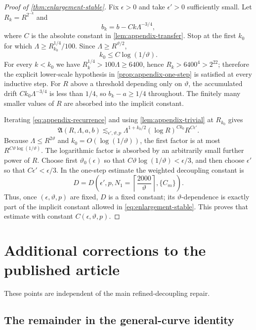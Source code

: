 \documentclass[11pt,letterpaper]{amsart}
\begin{document}
\begin{proof}[Proof of \cref{thm:enlargement-stable}]
Fix $\epsilon>0$ and take $\epsilon'>0$ sufficiently small.  Let
$R_k=R^{2^{-k}}$ and
\[
 b_k=b-Ck\Lambda^{-3/4},
\]
where $C$ is the absolute constant in \cref{lem:appendix-transfer}.  Stop at
the first $k_0$ for which $\Lambda\ge R_{k_0}^{1/4}/100$.  Since
$\Lambda\ge R^{\vartheta/2}$,
\[
 k_0\le C\log(1/\vartheta).
\]
For every $k<k_0$ we have
$R_k^{1/4}>100\Lambda\ge6400$, hence
$R_k>6400^4>2^{22}$; therefore the explicit lower-scale hypothesis in
\cref{prop:appendix-one-step} is satisfied at every inductive step.
For $R$ above a threshold depending only on $\vartheta$, the accumulated
drift $Ck_0\Lambda^{-3/4}$ is less than $1/4$, so $b_k-a\ge1/4$ throughout.
The finitely many smaller values of $R$ are absorbed into the implicit
constant.

Iterating \eqref{eq:appendix-recurrence} and using
\cref{lem:appendix-trivial} at $R_{k_0}$ gives
\[
 \mathfrak A(R,\Lambda,a,b)
 \lesssim_{\epsilon',\vartheta,p}
 \Lambda^{1+k_0/2}
 (\log R)^{Ck_0}
 R^{C\epsilon'}.
\]
Because $\Lambda\le R^{2\vartheta}$ and
$k_0=O(\log(1/\vartheta))$, the first factor is at most
$R^{C\vartheta\log(1/\vartheta)}$.  The logarithmic factor is absorbed by an
arbitrarily small further power of $R$.  Choose first $\vartheta_0(\epsilon)$
so that
$C\vartheta\log(1/\vartheta)<\epsilon/3$, and then choose
$\epsilon'$ so that $C\epsilon'<\epsilon/3$.  In the one-step estimate the
weighted decoupling constant is
\[
 D=D\!\left(\epsilon',p,
       N_1=\left\lceil\frac{2000}{\vartheta}\right\rceil,
       \{C_m\}\right).
\]
Thus, once $(\epsilon,\vartheta,p)$ are fixed, $D$ is a fixed constant; its
$\vartheta$-dependence is exactly part of the implicit constant allowed in
\eqref{eq:enlargement-stable}.  This proves that estimate with constant
$C(\epsilon,\vartheta,p)$.
\end{proof}

\section{Additional corrections to the published article}\label{app:additional-corrections}

These points are independent of the main refined-decoupling repair.

\subsection{The remainder in the general-curve identity}
\end{document}
